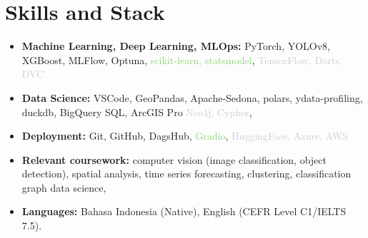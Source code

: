 \documentclass[a4paper, 11pt]{article}
\newcommand{\resumeItem}[2]{
    \item\small{
        \textbf{#1}{#2 \vspace{-2pt}}
    }
}
\newcommand{\resumeItemPaper}[1]{
    \item\small{
            {#1}
    }
}
\newcommand{\resumeItemListStart}{\begin{itemize}[leftmargin=*]\setlength\itemsep{0em}\vspace{-1pt}}
\newcommand{\resumeItemListEnd}{\end{itemize}\vspace{-5pt}}
\begin{document}
    \section{Skills and Stack}
    \resumeItemListStart
    \resumeItem{Machine Learning, Deep Learning, MLOps:}{ %
        PyTorch, YOLOv8, XGBoost, MLFlow, Optuna, 
        \textcolor[HTML]{8bd274}{scikit-learn, statsmodel}, %
        \textcolor[HTML]{C8cfd4}{TensorFlow, Darts, DVC} %
    }
    \resumeItem{Data Science:}{
        VSCode, GeoPandas, Apache-Sedona, polars, ydata-profiling,
        duckdb, BigQuery SQL, ArcGIS Pro
        \textcolor[HTML]{C8cfd4}{Neo4j, Cypher}, 
    }
    \resumeItem{Deployment:}{
        Git, GitHub, DagsHub, 
        \textcolor[HTML]{8bd274}{Gradio},
        \textcolor[HTML]{C8cfd4}{HuggingFace, Azure, AWS}
    }
    \resumeItem{Relevant coursework:}{
        computer vision (image classification, object detection),
        spatial analysis,
        time series forecasting,
        clustering,
        classification
        graph data science,
    }
    \resumeItem{Languages:}{
        Bahasa Indonesia (Native), 
        English (CEFR Level C1/IELTS 7.5).
    }
    \resumeItemListEnd
\end{document}
